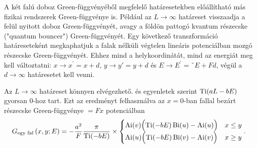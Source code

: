 A két falú doboz Green-függvényéből megfelelő határesetekben előállítható más fizikai rendszerek Green-függvénye is. Például az $L\to\infty$ határeset visszaadja a felül nyitott doboz Green-függvényét, avagy a földön pattogó kvantum részecske ("quantum bouncer") Green-függvényét. Egy következő transzformáció határeseteként megkaphatjuk a falak nélküli végtelen lineáris potenciálban mozgó részecske Green-függvényét. Ehhez mind a helykoordinátát, mind az energiát meg kell változtatni: $x\to x^\prime=x+d$, $y\to y\prime=y+d$ és $E\to E^\prime=ˇE+Fd$, végül a $d\to\infty$ határesetet kell venni.

Az $L\to\infty$ határeset könnyen elvégezhető.  és  egyenletek szerint $\operatorname{Ti}(aL-bE)$ gyorsan $0$-hoz tart. Ezt az eredményt felhasználva az $x=0$-ban fallal bezárt részecske Green-függvénye $=Fx$ potenciálban
\begin{equation}
	G_{\text{egy fal}}\left(x,y;E\right) = -\frac{a^2}{F}\frac{\pi}{\operatorname{Ti}(-bE)}\times
	\begin{cases}
		\operatorname{Ai}(v)\Bigl(\operatorname{Ti}(-bE)\operatorname{Bi}(u)-\operatorname{Ai}(u)\Bigr)& x \leq y\\
		\operatorname{Ai}(u)\Bigl(\operatorname{Ti}(-bE)\operatorname{Bi}(v)-\operatorname{Ai}(v)\Bigr)& x \geq y
	\end{cases}.
	\label{limits:semiinfinite}
\end{equation}

